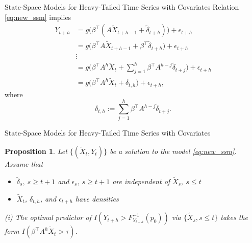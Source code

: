 \documentclass{beamer}
\newtheorem{proposition}{Proposition}
\begin{document}
\begin{frame}{State-Space Models for Heavy-Tailed Time Series with Covariates}
    Relation \eqref{eq:new_ssm} implies
    \begin{align*}
        Y_{t+h} &= g \Big( \beta^\top ( A \tilde X_{t+h-1} + \tilde  \delta_{t+h})\Big ) + \epsilon_{t+h} \\
        &= g \Big( \beta^\top A \tilde X_{t + h-1} +  \beta^\top \tilde  \delta_{t+h}  \Big) + \epsilon_{t+h} \\
        &\vdots \\
        &= g \Big( \beta^\top A^h \tilde X_t + \sum_{j=1}^h \beta^\top A^{h - j}\tilde  \delta_{t+j}  \Big) +  \epsilon_{t+h} \\
        &= g \Big( \beta^\top A^h \tilde X_t + \delta_{t,h} \Big) + \epsilon_{t+h},
    \end{align*}
    where 
    \begin{equation*}
    \delta_{t,h}:= \sum_{j=1}^h \beta^\top A^{h - j}\tilde  \delta_{t+j}.
    \end{equation*}
\end{frame}

\begin{frame}{State-Space Models for Heavy-Tailed Time Series with Covariates}
    \begin{proposition}
        Let $\{(\tilde X_t,Y_t)\}$ be a solution to the model \eqref{eq:new_ssm}. Assume that
        \begin{itemize}
            \item $\tilde{\delta}_s, \ s \ge t + 1$ and $\epsilon_s, \ s \ge t + 1$ are independent of $\tilde{X}_s, \ s \le t$
            \item $\tilde X_t$, $\delta_{t, h}$, and $\epsilon_{t+h}$ have densities
        \end{itemize}

        \medskip
        
        {\em (i)} The optimal predictor of $I(Y_{t+h}> F_{Y_{t+h}}^{-1}(p_0))$
        via $\{ \tilde X_s, s\le t\}$ takes the form $I(\beta^\top A^{h}\tilde X_t > \tau)$.
    \end{proposition}
\end{frame}
\end{document}
